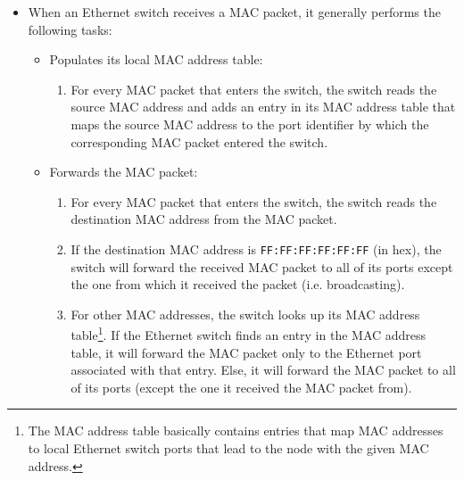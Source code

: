 \documentclass[pdftex,12pt,a4paper]{article}
\begin{document}
\begin{itemize}
                \item When an Ethernet switch receives a MAC packet, it
                generally performs the following tasks:
                    \begin{itemize}
                        \item Populates its local MAC address table:
                            \begin{enumerate}
                                \item For every MAC packet that enters the switch, the
                                switch reads the source MAC address and adds an entry
                                in its MAC address table that maps the source MAC
                                address to the port identifier by which the
                                corresponding MAC packet entered the switch.
                            \end{enumerate}
                        \item Forwards the MAC packet:
                            \begin{enumerate}
                                \item For every MAC packet that enters the switch, the
                                switch reads the destination MAC address from the MAC
                                packet.
                                \item If the destination MAC address is
                                \texttt{FF:FF:FF:FF:FF:FF} (in hex), the switch will
                                forward the received MAC packet to all of its
                                ports except the one from which it received the
                                packet (i.e. broadcasting).
                                \item For other MAC addresses, the switch looks
                                up its MAC address table\footnote{The MAC
                                address table basically contains entries that
                                map MAC addresses to local Ethernet switch
                                ports that lead to the node with the given MAC
                                address.}. If the Ethernet switch finds an entry in the MAC
                                address table, it will forward the MAC packet only to the
                                Ethernet port associated with that entry. Else,
                                it will forward the MAC packet to all of its
                                ports (except the one it received the MAC
                                packet from).
                            \end{enumerate}
                    \end{itemize}
            \end{itemize}
\end{document}
